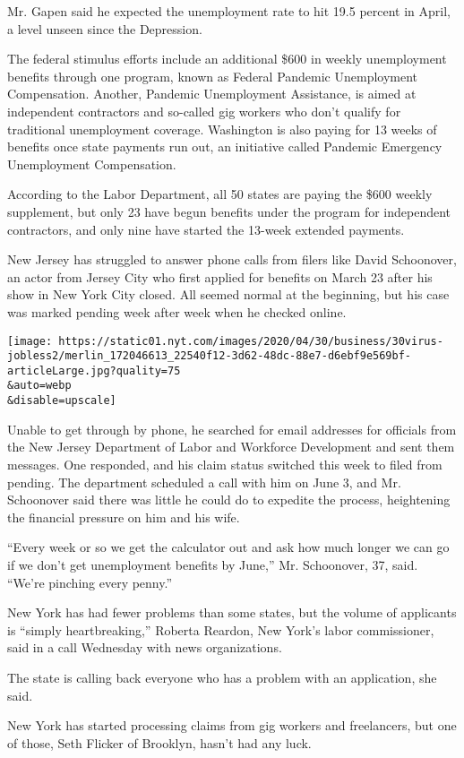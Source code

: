 Mr. Gapen said he expected the unemployment rate to hit 19.5 percent in
April, a level unseen since the Depression.

The federal stimulus efforts include an additional \$600 in weekly
unemployment benefits through one program, known as Federal Pandemic
Unemployment Compensation. Another, Pandemic Unemployment Assistance, is
aimed at independent contractors and so-called gig workers who don't
qualify for traditional unemployment coverage. Washington is also paying
for 13 weeks of benefits once state payments run out, an initiative
called Pandemic Emergency Unemployment Compensation.

According to the Labor Department, all 50 states are paying the \$600
weekly supplement, but only 23 have begun benefits under the program for
independent contractors, and only nine have started the 13-week extended
payments.

New Jersey has struggled to answer phone calls from filers like David
Schoonover, an actor from Jersey City who first applied for benefits on
March 23 after his show in New York City closed. All seemed normal at
the beginning, but his case was marked pending week after week when he
checked online.

\texttt{[image: https://static01.nyt.com/images/2020/04/30/business/30virus-jobless2/merlin\_172046613\_22540f12-3d62-48dc-88e7-d6ebf9e569bf-articleLarge.jpg?quality=75\\\&auto=webp\\\&disable=upscale]}

Unable to get through by phone, he searched for email addresses for
officials from the New Jersey Department of Labor and Workforce
Development and sent them messages. One responded, and his claim status
switched this week to filed from pending. The department scheduled a
call with him on June 3, and Mr. Schoonover said there was little he
could do to expedite the process, heightening the financial pressure on
him and his wife.

``Every week or so we get the calculator out and ask how much longer we
can go if we don't get unemployment benefits by June,'' Mr. Schoonover,
37, said. ``We're pinching every penny.''

New York has had fewer problems than some states, but the volume of
applicants is ``simply heartbreaking,'' Roberta Reardon, New York's
labor commissioner, said in a call Wednesday with news organizations.

The state is calling back everyone who has a problem with an
application, she said.

New York has started processing claims from gig workers and freelancers,
but one of those, Seth Flicker of Brooklyn, hasn't had any luck.

